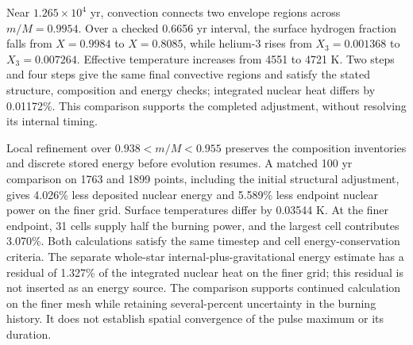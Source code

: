\documentclass[11pt,letterpaper]{article}
\begin{document}
Near $1.265\times10^4$ yr, convection connects two envelope regions across
$m/M=0.9954$. Over a checked 0.6656 yr interval, the surface hydrogen
fraction falls from $X=0.9984$ to $X=0.8085$, while helium-3 rises from
$X_3=0.001368$ to $X_3=0.007264$. Effective temperature increases from
4551 to 4721 K. Two steps and four steps give the same final convective
regions and satisfy the stated structure, composition and energy checks;
integrated nuclear heat differs by 0.01172\%. This comparison supports
the completed adjustment, without resolving its internal timing.

Local refinement over $0.938<m/M<0.955$ preserves the composition
inventories and discrete stored energy before evolution resumes. A matched
100 yr comparison on 1763 and 1899 points, including the initial structural
adjustment, gives 4.026\% less deposited nuclear energy and 5.589\% less
endpoint nuclear power on the finer grid. Surface temperatures differ by
0.03544 K. At the finer endpoint, 31 cells supply half the burning power,
and the largest cell contributes 3.070\%. Both calculations satisfy the
same timestep and cell energy-conservation criteria. The separate
whole-star internal-plus-gravitational energy estimate has a residual of
1.327\% of the integrated nuclear heat on the finer grid; this residual
is not inserted as an energy source. The comparison supports continued
calculation on the finer mesh while retaining several-percent uncertainty
in the burning history. It does not establish spatial convergence of the
pulse maximum or its duration.
\end{document}

